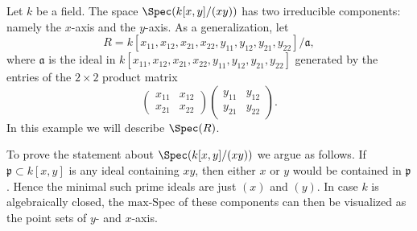 \begin{example}
\label{example-product-matrices-zero}
Let $k$ be a field. The space $\Spec(k[x, y]/(xy))$
has two irreducible components: namely the $x$-axis and the
$y$-axis. As a generalization, let
$$
R = k[x_{11}, x_{12}, x_{21}, x_{22}, y_{11}, y_{12}, y_{21}, y_{22}]/
\mathfrak a,
$$
where $\mathfrak a$ is the ideal in
$k[x_{11}, x_{12}, x_{21}, x_{22}, y_{11}, y_{12}, y_{21}, y_{22}]$
generated by the entries of the $2 \times 2$ product matrix
$$
\left(
\begin{matrix}
x_{11} & x_{12}\\
x_{21} & x_{22}
\end{matrix}
\right)
 \left(
\begin{matrix}
y_{11} & y_{12}\\
y_{21} & y_{22}
\end{matrix}
\right).
$$
In this example we will describe $\Spec(R)$.

\medskip\noindent
To prove the statement about $\Spec(k[x, y]/(xy))$ we argue as follows.
If $\mathfrak p \subset k[x, y]$ is any ideal containing $xy$, then either
$x$ or $y$ would be contained in $\mathfrak p$. Hence the minimal such
prime ideals are just $(x)$ and $(y)$. In case $k$ is
algebraically closed, the $\text{max-Spec}$ of these components
can then be visualized as the point sets of $y$- and $x$-axis.


\end{example}

